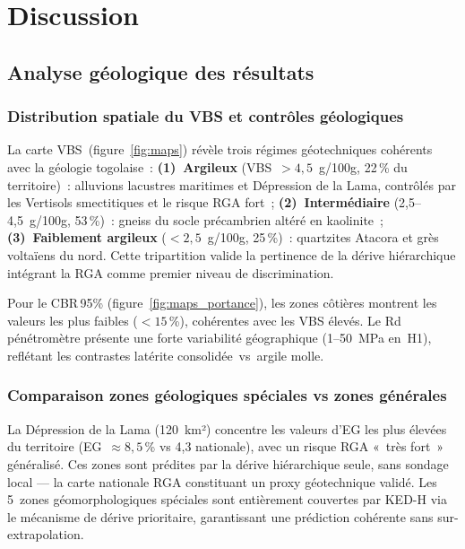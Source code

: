 \documentclass[10pt,a4paper,twocolumn]{article}
\begin{document}
	\section{Discussion}
	\label{sec:discussion}
	
	\subsection{Analyse géologique des résultats}
	\label{subsec:geologie}
	
	\subsubsection{Distribution spatiale du VBS et contrôles géologiques}
	
	La carte VBS~(figure~\ref{fig:maps}) révèle trois régimes géotechniques
	cohérents avec la géologie togolaise~:
	\textbf{(1)~Argileux} (VBS~$>4{,}5$~g/100g, 22\,\% du territoire)~:
	alluvions lacustres maritimes et Dépression de la Lama, contrôlés
	par les Vertisols smectitiques et le risque RGA fort~;
	\textbf{(2)~Intermédiaire} (2{,}5--4{,}5~g/100g, 53\,\%)~:
	gneiss du socle précambrien altéré en kaolinite~;
	\textbf{(3)~Faiblement argileux} ($<2{,}5$~g/100g, 25\,\%)~:
	quartzites Atacora et grès voltaïens du nord.
	Cette tripartition valide la pertinence de la dérive hiérarchique
	intégrant la RGA comme premier niveau de discrimination.
	
	Pour le CBR\,95\% (figure~\ref{fig:maps_portance}), les zones
	côtières montrent les valeurs les plus faibles ($<15$\,\%),
	cohérentes avec les VBS élevés. Le Rd pénétromètre présente une
	forte variabilité géographique (1--50~MPa en~H1), reflétant les
	contrastes latérite consolidée~vs~argile molle.
	
	\subsubsection{Comparaison zones géologiques spéciales vs zones générales}
	
	La Dépression de la Lama (120~km²) concentre les valeurs d'EG
	les plus élevées du territoire (EG~$\approx8{,}5$\,\% vs 4{,}3
	nationale), avec un risque RGA «~très fort~» généralisé.
	Ces zones sont prédites par la dérive hiérarchique seule, sans
	sondage local --- la carte nationale RGA constituant un proxy
	géotechnique validé. Les 5~zones géomorphologiques spéciales
	sont entièrement couvertes par KED-H via le mécanisme de dérive
	prioritaire, garantissant une prédiction cohérente sans sur-extrapolation.
	
\end{document}
